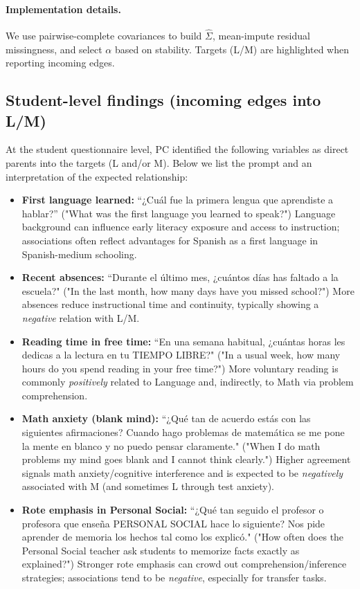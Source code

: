 \documentclass[11pt, a4paper]{article}
\begin{document}
\paragraph{Implementation details.}
We use pairwise-complete covariances to build $\hat\Sigma$, mean-impute residual missingness, and select $\alpha$ based on stability. Targets (L/M) are highlighted when reporting incoming edges.

\subsection*{Student-level findings (incoming edges into L/M)}
At the student questionnaire level, PC identified the following variables as direct parents into the targets (L and/or M). Below we list the prompt and an interpretation of the expected relationship:
\begin{itemize}
  \item \textbf{First language learned:} ``¿Cuál fue la primera lengua que aprendiste a hablar?'' ("What was the first language you learned to speak?") Language background can influence early literacy exposure and access to instruction; associations often reflect advantages for Spanish as a first language in Spanish-medium schooling.
  \item \textbf{Recent absences:} ``Durante el último mes, ¿cuántos días has faltado a la escuela?" ("In the last month, how many days have you missed school?") More absences reduce instructional time and continuity, typically showing a \emph{negative} relation with L/M.
  \item \textbf{Reading time in free time:} ``En una semana habitual, ¿cuántas horas les dedicas a la lectura en tu TIEMPO LIBRE?" ("In a usual week, how many hours do you spend reading in your free time?") More voluntary reading is commonly \emph{positively} related to Language and, indirectly, to Math via problem comprehension.
  \item \textbf{Math anxiety (blank mind):} ``¿Qué tan de acuerdo estás con las siguientes afirmaciones? Cuando hago problemas de matemática se me pone la mente en blanco y no puedo pensar claramente." ("When I do math problems my mind goes blank and I cannot think clearly.") Higher agreement signals math anxiety/cognitive interference and is expected to be \emph{negatively} associated with M (and sometimes L through test anxiety).
  \item \textbf{Rote emphasis in Personal Social:} ``¿Qué tan seguido el profesor o profesora que enseña PERSONAL SOCIAL hace lo siguiente? Nos pide aprender de memoria los hechos tal como los explicó." ("How often does the Personal Social teacher ask students to memorize facts exactly as explained?") Stronger rote emphasis can crowd out comprehension/inference strategies; associations tend to be \emph{negative}, especially for transfer tasks.

\end{itemize}
\end{document}
